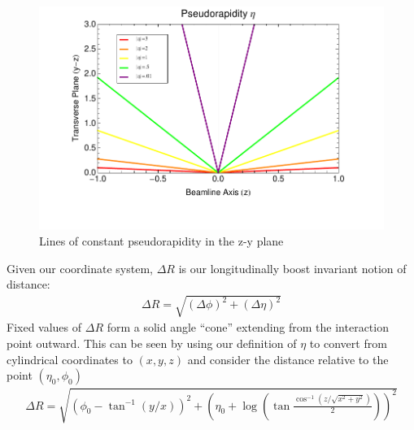 \begin{figure}
\begin{center}
\includegraphics[width=.6\textwidth]{figures/exp_proj/pseudorapidity}
\end{center}
\caption{Lines of constant pseudorapidity in the z-y plane}
\label{fig:pseudorapidity}
\end{figure}

 Given our coordinate system, $\Delta R$ is our longitudinally boost invariant notion of distance:
\begin{align*}
\Delta R = \sqrt{ (\Delta \phi)^2 + (\Delta \eta)^2}
\end{align*}
Fixed values of $\Delta R$ form a solid angle ``cone'' extending from the interaction point outward. This can be seen by using our definition of $\eta$ to convert from cylindrical coordinates to $(x,y,z)$ and consider the distance relative to the point $(\eta_0,\phi_0)$
\begin{align*}
\Delta R = \sqrt{ \left( \phi_0 - \tan^{-1} (y/x) \right )^2 + \left ( \eta_0 + \log \left( \tan \frac{\cos^{-1} (z/\sqrt{x^2+y^2})}{2} \right) \right)^2 }
\end{align*}

